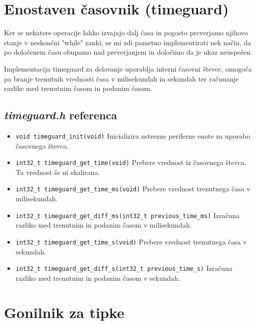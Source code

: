 \documentclass[12pt,a4paper,twoside,openright,slovene]{book}
\begin{document}
\section{Enostaven časovnik (timeguard)}

Ker se nekatere operacije lahko izvajajo dalj časa in pogosto preverjamo njihovo stanje v neskončni "while" zanki, se mi zdi pametno implementirati nek način, da po določenem času obupamo nad preverjanjem in določimo da je ukaz neuspešen.

Implementacija timeguard za delovanje uporablja interni časovni števec, omogoča pa branje trenutnih vrednosti časa v milisekundah in sekundah ter računanje razlike med trenutnim časom in podanim časom.


\subsection{\textit{timeguard.h} referenca}

\begin{itemize}
	\item[] \lstinline{void timeguard_init(void)}\newline
		Inicializira ustrezne periferne enote za uporabo časovnega števca.
	\item[] \lstinline{int32_t timeguard_get_time(void)}\newline
		Prebere vrednost iz časovnega števca. Ta vrednost še ni skalirana.
	\item[] \lstinline{int32_t timeguard_get_time_ms(void)}\newline
		Prebere vrednost trenutnega časa v milisekundah.
	\item[] \lstinline{int32_t timeguard_get_diff_ms(int32_t previous_time_ms)}\newline
		Izračuna razliko med trenutnim in podanim časom v milisekundah.
	\item[] \lstinline{int32_t timeguard_get_time_s(void)}\newline
		Prebere vrednost trenutnega časa v sekundah.
	\item[] \lstinline{int32_t timeguard_get_diff_s(int32_t previous_time_s)}\newline
		Izračuna razliko med trenutnim in podanim časom v sekundah.
\end{itemize}



\section{Gonilnik za tipke}
\end{document}
